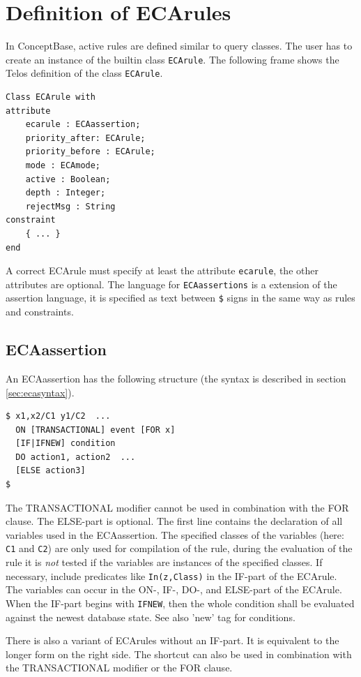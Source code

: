\section{Definition of ECArules}

In ConceptBase, active rules are defined similar to query classes.
The user has to create an instance of the builtin class {\tt ECArule}.
The following frame shows the Telos definition of the class {\tt ECArule}.

{\small
\begin{verbatim}
Class ECArule with
attribute
    ecarule : ECAassertion;
    priority_after: ECArule;
    priority_before : ECArule;
    mode : ECAmode;
    active : Boolean;
    depth : Integer;
    rejectMsg : String
constraint
    { ... }
end
\end{verbatim}
}

A correct ECArule must specify at least the attribute {\tt ecarule},
the other attributes are optional. The language for {\tt ECAassertions}
is a extension of the assertion language, it is specified as text between
\verb+$+ signs in the same way as rules and constraints.

\subsection{ECAassertion}

An ECAassertion has the following structure (the syntax is described
in section \ref{sec:ecasyntax}).
{\small
\begin{verbatim}
$ x1,x2/C1 y1/C2  ...
  ON [TRANSACTIONAL] event [FOR x]
  [IF|IFNEW] condition
  DO action1, action2  ...
  [ELSE action3]
$
\end{verbatim}
}


The TRANSACTIONAL modifier cannot be used in combination with the 
FOR clause. 
The ELSE-part is optional.
The first line contains the declaration of all variables
used in the ECAassertion. The specified classes of the variables
(here: {\tt C1} and {\tt C2}) are only used for compilation
of the rule, during the evaluation of the rule it is {\em not} tested
if the variables are instances of the specified classes. If necessary, 
include predicates like \verb+In(z,Class)+ in the IF-part of the ECArule.
The variables can occur in the ON-, IF-, DO-, and ELSE-part of the ECArule.
When the IF-part begins with {\tt IFNEW}, then the whole
condition shall be evaluated against the newest database state. See also
'new' tag for conditions.

There is also a variant of ECArules without an IF-part. It is equivalent to
the longer form on the right side. The shortcut can also be used in combination
with the TRANSACTIONAL modifier or the FOR clause.

